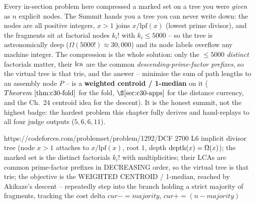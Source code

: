 
\begin{notebox}
Every in-section problem here compressed a marked set on a tree you were \emph{given} as
\(n\) explicit nodes. The Summit hands you a tree you can never write down: the nodes
are all positive integers, \(x>1\) joins \(x/\!\text{lpf}(x)\) (lowest prime divisor), and
the fragments sit at factorial nodes \(k_i!\) with \(k_i\le 5000\) -- so the tree is
astronomically deep (\(\Omega(5000!)\approx 30{,}000\)) and its node labels overflow any
machine integer. The compression is the whole solution: only the \(\le 5000\) \emph{distinct}
factorials matter, their \(\operatorname{lca}\) are the common \emph{descending-prime-factor prefixes}, so
the virtual tree is that trie, and the answer -- minimise the sum of path lengths to an
assembly node \(P\) -- is a \textbf{weighted centroid / 1-median} on it
(\(\thmref{c30-fold}\) for the fold, \(\secref{c30-apps}\) for the distance currency, and the
Ch.~24 centroid idea for the descent). It is the honest summit, not the highest badge: the
hardest problem this chapter fully derives and hand-replays to all four judge outputs
(\(5,6,6,11\)).
\end{notebox}

  {https://codeforces.com/problemset/problem/1292/D}{CF 2700 L6}
  {implicit divisor tree (node \(x\!>\!1\) attaches to \(x/\!\text{lpf}(x)\), root \(1\),
   depth \(\operatorname{depth}(x)=\Omega(x)\)); the marked set is the distinct factorials \(k_i!\) with
   multiplicities; their LCAs are common prime-factor prefixes in DECREASING order, so the
   virtual tree is that trie; the objective is the WEIGHTED CENTROID / 1-median, reached by
   Akikaze's descent -- repeatedly step into the branch holding a strict majority of fragments,
   tracking the cost delta \(\mathit{cur}-=\mathit{majority}\), \(\mathit{cur}+= (n-\mathit{majority})\)}

